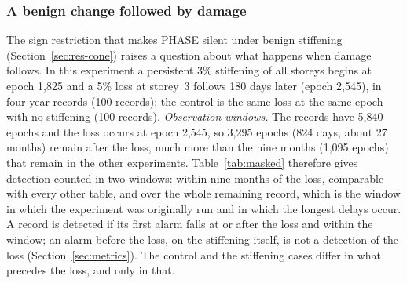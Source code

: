 \documentclass[12pt,a4paper]{article}
\newenvironment{revblock}{}{}
\newenvironment{revblock}{\begingroup\color{revcol}}{\endgroup}
\newcommand{\rtwo}[1]{#1}
\newcommand{\rtwo}[1]{{\color{revcolb}#1}}
\begin{document}
\begin{revblock}
\subsubsection{A benign change followed by damage}\label{sec:res-masked}

The sign restriction that makes PHASE silent under benign stiffening (Section~\ref{sec:res-cone}) raises a question about what happens when damage follows. In this experiment a persistent 3\% stiffening of all storeys begins at epoch 1{,}825 and a 5\% loss at storey~3 follows 180 days later (epoch 2{,}545), in four-year records (100 records); the control is the same loss at the same epoch with no stiffening (100 records). \rtwo{\emph{Observation windows.} The records have 5{,}840 epochs and the loss occurs at epoch 2{,}545, so 3{,}295 epochs (824 days, about 27 months) remain after the loss, much more than the nine months (1{,}095 epochs) that remain in the other experiments.} \rtwo{Table~\ref{tab:masked} therefore gives detection counted in two windows: within nine months of the loss, comparable with every other table, and over the whole remaining record, which is the window in which the experiment was originally run and in which the longest delays occur.} \rtwo{A record is detected if its first alarm falls at or after the loss and within the window; an alarm before the loss, on the stiffening itself, is not a detection of the loss (Section~\ref{sec:metrics}).} \rtwo{The control and the stiffening cases differ in what precedes the loss, and only in that.}


\end{revblock}
\end{document}
